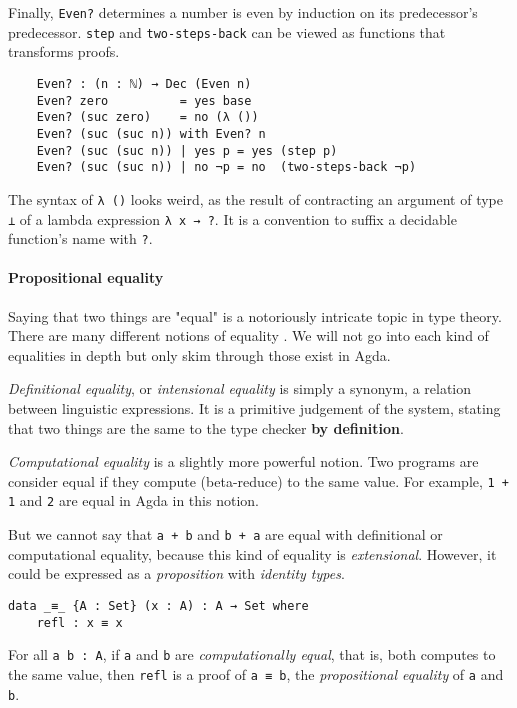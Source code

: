 \documentclass[../thesis.tex]{subfiles}
\begin{document}
Finally, {\lstinline|Even?|} determines a number is even by induction on its
predecessor's predecessor. {\lstinline|step|} and {\lstinline|two-steps-back|}
can be viewed as functions that transforms proofs.

\begin{lstlisting}
    Even? : (n : ℕ) → Dec (Even n)
    Even? zero          = yes base
    Even? (suc zero)    = no (λ ())
    Even? (suc (suc n)) with Even? n
    Even? (suc (suc n)) | yes p = yes (step p)
    Even? (suc (suc n)) | no ¬p = no  (two-steps-back ¬p)
\end{lstlisting}

The syntax of {\lstinline|λ ()|} looks weird, as the result of contracting
an argument of type {\lstinline|⊥|} of a lambda expression {\lstinline|λ x → ?|}.
It is a convention to suffix a decidable function's name with {\lstinline|?|}.

\paragraph{Propositional equality}

Saying that two things are "equal" is a notoriously intricate topic in type theory.
There are many different notions of equality
\cite{equality}. We will not go
into each kind of equalities in depth but only skim through those exist in Agda.

\textit{Definitional equality}, or \textit{intensional equality} is simply a
synonym, a relation between linguistic expressions. It is a primitive judgement
of the system, stating that two things are the same to the type checker
\textbf{by definition}.

\textit{Computational equality} is a slightly more powerful notion.
Two programs are consider equal if they compute (beta-reduce) to the same value.
For example, {\lstinline|1 + 1|} and {\lstinline|2|} are equal in Agda in this notion.

But we cannot say that {\lstinline|a + b|} and {\lstinline|b + a|}
are equal with definitional or computational equality, because this kind of equality
is \textit{extensional}. However, it could be expressed as a \textit{proposition}
with \textit{identity types}.

\begin{lstlisting}
data _≡_ {A : Set} (x : A) : A → Set where
    refl : x ≡ x
\end{lstlisting}

For all {\lstinline|a b : A|}, if {\lstinline|a|} and {\lstinline|b|} are
\textit{computationally equal}, that is, both computes to the same value,
then {\lstinline|refl|} is a proof of {\lstinline|a ≡ b|},
the \textit{propositional equality} of {\lstinline|a|} and {\lstinline|b|}.
\end{document}
